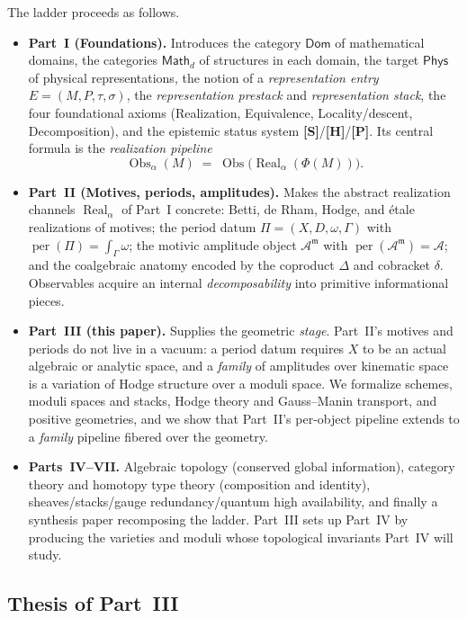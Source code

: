 \documentclass[12pt]{article}
\theoremstyle{definition}
\theoremstyle{remark}
\newcommand{\Real}{\operatorname{Real}}
\newcommand{\Obs}{\operatorname{Obs}}
\newcommand{\Dom}{\mathsf{Dom}}
\newcommand{\Math}{\mathsf{Math}}
\newcommand{\Phys}{\mathsf{Phys}}
\newcommand{\per}{\operatorname{per}}
\newcommand{\amp}{\mathcal{A}}
\newcommand{\status}[1]{\textnormal{\textsf{\textbf{[#1]}}}}
\begin{document}
The ladder proceeds as follows.
\begin{itemize}
  \item \textbf{Part~I (Foundations).} Introduces the category $\Dom$ of mathematical domains, the
  categories $\Math_d$ of structures in each domain, the target $\Phys$ of physical representations,
  the notion of a \emph{representation entry} $E=(M,P,\tau,\sigma)$, the \emph{representation
  prestack} and \emph{representation stack}, the four foundational axioms (Realization,
  Equivalence, Locality/descent, Decomposition), and the epistemic status system \status{S}/\status{H}/\status{P}.
  Its central formula is the \emph{realization pipeline}
  \begin{equation}\label{eq:pipeline}
    \Obs_\alpha(M) \;=\; \Obs\bigl(\Real_\alpha(\Phi(M))\bigr).
  \end{equation}
  \item \textbf{Part~II (Motives, periods, amplitudes).} Makes the abstract realization channels
  $\Real_\alpha$ of Part~I concrete: Betti, de Rham, Hodge, and \'etale realizations of motives; the
  period datum $\Pi=(X,D,\omega,\Gamma)$ with $\per(\Pi)=\int_\Gamma\omega$; the motivic amplitude
  object $\amp^{\mathfrak m}$ with $\per(\amp^{\mathfrak m})=\amp$; and the coalgebraic anatomy
  encoded by the coproduct $\Delta$ and cobracket $\delta$. Observables acquire an internal
  \emph{decomposability} into primitive informational pieces.
  \item \textbf{Part~III (this paper).} Supplies the geometric \emph{stage}. Part~II's motives and
  periods do not live in a vacuum: a period datum requires $X$ to be an actual algebraic or analytic
  space, and a \emph{family} of amplitudes over kinematic space is a variation of Hodge structure over
  a moduli space. We formalize schemes, moduli spaces and stacks, Hodge theory and Gauss--Manin
  transport, and positive geometries, and we show that Part~II's per-object pipeline extends to a
  \emph{family} pipeline fibered over the geometry.
  \item \textbf{Parts~IV--VII.} Algebraic topology (conserved global information), category
  theory and homotopy type theory (composition and identity), sheaves/stacks/gauge redundancy/quantum
  high availability, and finally a synthesis paper recomposing the ladder. Part~III sets up Part~IV by
  producing the varieties and moduli whose topological invariants Part~IV will study.
\end{itemize}

\subsection{Thesis of Part~III}
\end{document}
